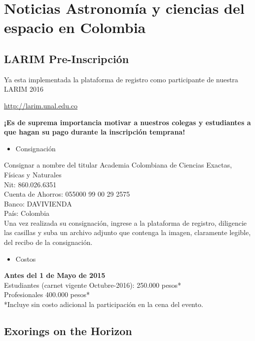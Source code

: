 \documentclass{book}
\begin{document}
\newcommand{\theimage}{fig22.jpg}
 
\tableofcontents{}

\section*{Noticias Astronomía y ciencias del espacio en Colombia}
\subsection{LARIM Pre-Inscripción}

Ya esta implementada la plataforma de registro como participante de nuestra LARIM 2016
\begin{center}
\url{http://larim.unal.edu.co}
\end{center}
\textbf{¡Es de suprema importancia motivar a nuestros colegas y estudiantes a que hagan su pago durante la inscripción temprana!}
\begin{itemize}
\item Consignación
\end{itemize}
Consignar a nombre del titular Academia Colombiana de Ciencias Exactas, Físicas y Naturales\\
Nit: 860.026.6351\\
Cuenta de Ahorros: 055000 99 00 29 2575\\
Banco: DAVIVIENDA\\
País: Colombia\\
Una vez realizada su consignación, ingrese a la plataforma de registro, diligencie las casillas y  suba un archivo adjunto que contenga la imagen, claramente legible, del recibo de la consignación. 
\begin{itemize}
\item Costos
\end{itemize}
\textbf{Antes del 1 de Mayo de 2015}\\
Estudiantes (carnet vigente Octubre-2016): 250.000 pesos*\\
Profesionales 400.000 pesos*\\
*Incluye sin costo adicional la participación en la cena del evento.


\subsection{Exorings on the Horizon}
\end{document}

